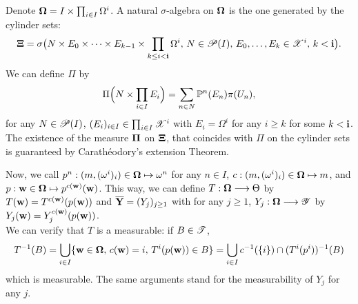 Denote $\mathbf{\Omega}= I \times\prod_{i\in I}\Omega^i$. A natural $\sigma$-algebra on $\mathbf{\Omega}$ is the one generated by the cylinder sets:
\begin{equation}
    \mathbf{\Xi} = \sigma\big(N\times E_0\times\dots\times E_{k-1}\times\prod_{k\leq i<\mathbf{i}}\Omega^i,\,N\in\mathscr{P}(I),\, E_0,\dots,E_k\in\mathscr{X}^i,\,k<\mathbf{i} \big).
\end{equation}
We can define $\Pi$ by
    \begin{equation}
        \Pi\Big(N\times\prod_{i\in I}E_i\Big) = \sum_{n\in N}\mathbb{P}^n(E_n)\pi(U_n),
    \end{equation}
for any $N\in\mathscr{P}(I)$, $(E_i)_{i \in I} \in\prod_{i\in I}\mathscr{X}^i$ with $E_i=\Omega^i$ for any $i\geq k$ for some $k<\mathbf{i}$. 
The existence of the measure $\mathbf{\Pi}$ on $\mathbf{\Xi}$, that coincides with $\Pi$ on the cylinder sets is guaranteed by  Carathéodory's extension Theorem. %




Now, we call $p^n:(m,(\omega^i)_i)\in\mathbf{\Omega}\mapsto \omega^n$ for any $n\in I$, $c:(m,(\omega^i)_i)\in\mathbf{\Omega}\mapsto m$, and $p:\mathbf{w}\in\mathbf{\Omega}\mapsto p^{c(\mathbf{w})}(\mathbf{w})$.
This way, we can define $T:\mathbf{\Omega}\longrightarrow\Theta$ by $T(\mathbf{w})=T^{c(\mathbf{w})}(p(\mathbf{w}))$ and $\overline{\mathbf{Y}}=(Y_j)_{j\geq1}$ with for any $j\geq1$, $Y_j:\mathbf{\Omega}\longrightarrow\mathscr{Y}$ by $Y_j(\mathbf{w})=Y_j^{c(\mathbf{w})}(p(\mathbf{w}))$.\\
We can verify that $T$ is a measurable: if $B\in\mathscr{T}$,  
    \begin{equation}
        T^{-1}(B) = \bigcup_{i\in I}\{\mathbf{w}\in\mathbf{\Omega},\, c(\mathbf{w})=i,\,T^i(p(\mathbf{w}))\in B  \} = \bigcup_{i\in I}c^{-1}(\{i\})\cap (T^i(p^i))^{-1}(B)
    \end{equation}
which is measurable. 
The same arguments stand for the measurability of $Y_j$ for any $j$.







